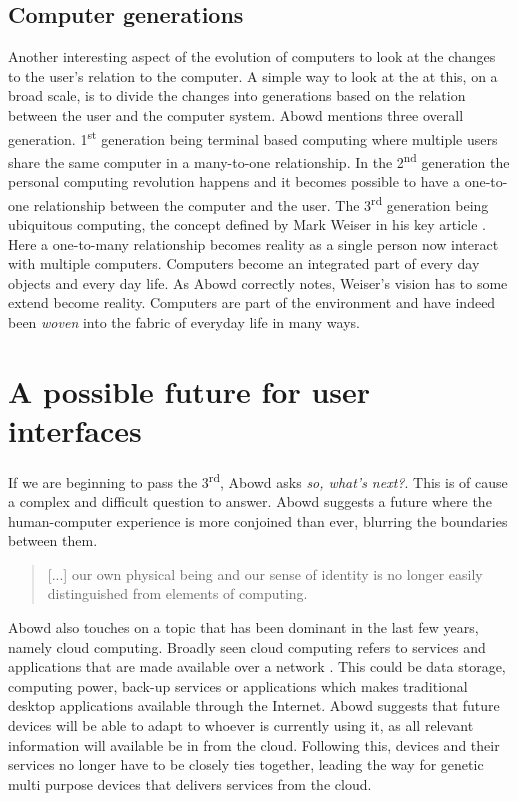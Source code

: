 \subsection{Computer generations}
Another interesting aspect of the evolution of computers to look at the changes to the user's relation to the computer.
A simple way to look at the at this, on a broad scale, is to divide the changes into generations based on the relation between the user and the computer system.
Abowd \citep{abowd2012next} mentions three overall generation.
1\textsuperscript{st} generation being terminal based computing where multiple users share the same computer in a many-to-one relationship.
In the 2\textsuperscript{nd} generation the personal computing revolution happens and it becomes possible to have a one-to-one relationship between the computer and the user.
The 3\textsuperscript{rd} generation being ubiquitous computing, the concept defined by Mark Weiser in his key article \cite{weiser1991computer}.
Here a one-to-many relationship becomes reality as a single person now interact with multiple computers. Computers become an integrated part of every day objects and every day life. 
As Abowd correctly notes, Weiser's vision has to some extend become reality. 
Computers are part of the environment and have indeed been \textit{woven} into the fabric of everyday life in many ways.   

\section{A possible future for user interfaces}
If we are beginning to pass the 3\textsuperscript{rd}, Abowd asks \textit{so, what's next?}.
This is of cause a complex and difficult question to answer.
Abowd suggests a future where the human-computer experience is more conjoined than ever, blurring the boundaries between them.
\begin{quote}
[...] our own physical being and our sense of identity is no longer easily distinguished from elements of computing.
\end{quote}
Abowd also touches on a topic that has been dominant in the last few years, namely cloud computing.
Broadly seen cloud computing refers to services and applications that are made available over a network .
This could be data storage, computing power, back-up services or applications which makes traditional desktop applications available through the Internet.
Abowd suggests that future devices will be able to adapt to whoever is currently using it, as all relevant information will available be in from the cloud.
Following this, devices and their services no longer have to be closely ties together, leading the way for genetic multi purpose devices that delivers services from the cloud.

